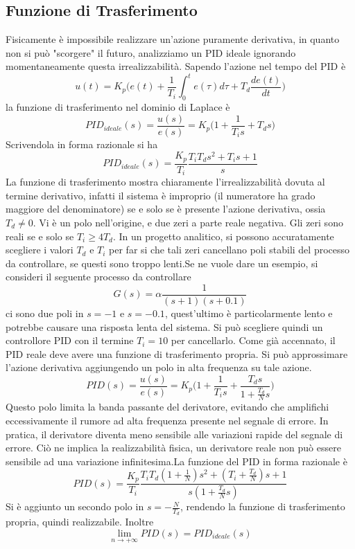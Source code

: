 \documentclass[10pt, letterpaper]{report}
\begin{document}
\subsection{Funzione di Trasferimento}
Fisicamente è impossibile realizzare un'azione puramente derivativa, in quanto non si può "scorgere" il futuro, analizziamo un PID ideale ignorando momentaneamente questa irrealizzabilità. Sapendo l'azione nel tempo del PID è 
$$ 
u(t)=K_p\Big(   e(t)+\frac{1}{T_i}\int_0^te(\tau)d\tau + T_d\frac{de(t)}{dt}    \Big)
$$
la funzione di trasferimento nel dominio di Laplace è 
$$ PID_{ideale}(s)=\frac{u(s)}{e(s)}= 
K_p\Big(1+\frac{1}{T_i s}+T_d s\Big)
$$
Scrivendola in forma razionale si ha 
$$  PID_{ideale}(s)= 
\frac{K_p}{T_i}\frac{T_iT_ds^2+T_is+1}{s}
$$
La funzione di trasferimento mostra chiaramente l'irrealizzabilità dovuta al termine derivativo, infatti il sistema è improprio (il numeratore ha grado maggiore del denominatore) se e solo se è presente l'azione derivativa, ossia $T_d\ne 0$.\acc 
Vi è un polo nell'origine, e due zeri a parte reale negativa. Gli zeri sono reali se e solo se $T_i\ge 4T_d$.\acc 
In un progetto analitico, si possono accuratamente scegliere i valori $T_d$ e $T_i$ per far si che tali zeri cancellano poli stabili del processo da controllare, se questi sono troppo lenti.\acc  Se ne vuole dare un esempio, si consideri il seguente processo da controllare 
$$ G(s)=\alpha\frac{1}{(s+1)(s+0.1)}$$
ci sono due poli in $s=-1$ e $s=-0.1$, quest'ultimo è particolarmente lento e potrebbe causare una risposta lenta del sistema. Si può scegliere quindi un controllore PID con il termine $T_i=10$ per cancellarlo.\acc 
Come già accennato, il PID reale deve avere una funzione di trasferimento propria. Si può approssimare l'azione derivativa aggiungendo un polo in alta frequenza su tale azione. 
$$ PID(s)=\frac{u(s)}{e(s)}= 
K_p\Big(1+\frac{1}{T_i s}+\dfrac{T_d s}{1+\frac{T_d}{N}s}\Big)
$$
Questo polo limita la banda passante del derivatore, evitando che amplifichi eccessivamente il rumore ad alta frequenza presente nel segnale di errore. In pratica, il derivatore diventa meno sensibile alle variazioni rapide del segnale di errore. Ciò ne implica la realizzabilità fisica, un derivatore reale non può essere sensibile ad una variazione infinitesima.\acc  La funzione del PID in forma razionale è 
$$ 
PID(s)=\frac{K_p}{T_i}\frac{T_iT_d(1+\frac{1}{N})s^2+(T_i+\frac{T_d}{N})s+1}{s(1+\frac{T_d}{N}s)}
$$
Si è aggiunto un secondo polo in $s=-\frac{N}{T_d}$, rendendo la funzione di trasferimento propria, quindi realizzabile. Inoltre 
$$ \lim_{n\rightarrow +\infty}PID(s)=PID_{ideale}(s)$$
\end{document}
